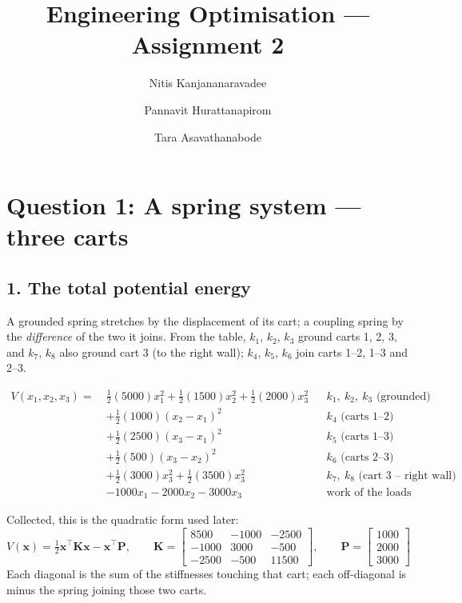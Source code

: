 \documentclass[11pt,a4paper]{article}
\title{Engineering Optimisation --- Assignment 2}
\author{Nitis Kanjananaravadee \and Pannavit Hurattanapirom \and Tara Asavathanabode}
\date{}
\begin{document}
\maketitle


\section*{Question 1: A spring system --- three carts}

\subsection*{1. The total potential energy}

A grounded spring stretches by the displacement of its cart; a coupling spring
by the \emph{difference} of the two it joins. From the table, $k_1$, $k_2$,
$k_3$ ground carts 1, 2, 3, and $k_7$, $k_8$ also ground cart 3 (to the right
wall); $k_4$, $k_5$, $k_6$ join carts 1--2, 1--3 and 2--3.

\begin{align*}
  V(x_1,x_2,x_3) =\ & \tfrac12 (5000)x_1^2 + \tfrac12 (1500)x_2^2
    + \tfrac12 (2000)x_3^2 && k_1,\ k_2,\ k_3 \text{ (grounded)} \\
  & + \tfrac12 (1000)(x_2 - x_1)^2 && k_4 \text{ (carts 1--2)} \\
  & + \tfrac12 (2500)(x_3 - x_1)^2 && k_5 \text{ (carts 1--3)} \\
  & + \tfrac12 (500)(x_3 - x_2)^2 && k_6 \text{ (carts 2--3)} \\
  & + \tfrac12 (3000)x_3^2 + \tfrac12 (3500)x_3^2 && k_7,\ k_8 \text{ (cart 3 -- right wall)} \\
  & - 1000x_1 - 2000x_2 - 3000x_3 && \text{work of the loads}
\end{align*}

Collected, this is the quadratic form used later:
\[
  V(\bm{x}) = \tfrac12 \bm{x}^\top \bm{K}\bm{x} - \bm{x}^\top \bm{P},
  \qquad
  \bm{K} = \begin{bmatrix} 8500 & -1000 & -2500 \\ -1000 & 3000 & -500 \\
                           -2500 & -500 & 11500 \end{bmatrix},
  \qquad
  \bm{P} = \begin{bmatrix} 1000 \\ 2000 \\ 3000 \end{bmatrix}
\]
Each diagonal is the sum of the stiffnesses touching that cart; each
off-diagonal is minus the spring joining those two carts.
\end{document}
